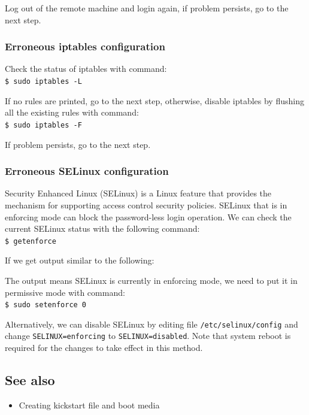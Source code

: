 Log out of the remote machine and login again, if problem persists, go to the next step.
\subsubsection*{Erroneous iptables configuration}
Check the status of iptables with command: \\
\verb|$ sudo iptables -L|

If no rules are printed, go to the next step, otherwise, disable iptables by flushing all the existing rules with command: \\
\verb|$ sudo iptables -F|

If problem persists, go to the next step.
\subsubsection*{Erroneous SELinux configuration}
Security Enhanced Linux (SELinux) is a Linux feature that provides the mechanism for supporting access control security policies. SELinux that is in enforcing mode can block the password-less login operation. We can check the current SELinux status with the following command: \\
\verb|$ getenforce|

If we get output similar to the following: \\

The output means SELinux is currently in enforcing mode, we need to put it in permissive mode with command: \\
\verb|$ sudo setenforce 0|

Alternatively, we can disable SELinux by editing file \verb|/etc/selinux/config| and change \verb|SELINUX=enforcing| to \verb|SELINUX=disabled|. Note that system reboot is required for the changes to take effect in this method.

\subsection*{See also}
\begin{itemize}
  \item Creating kickstart file and boot media
\end{itemize}
